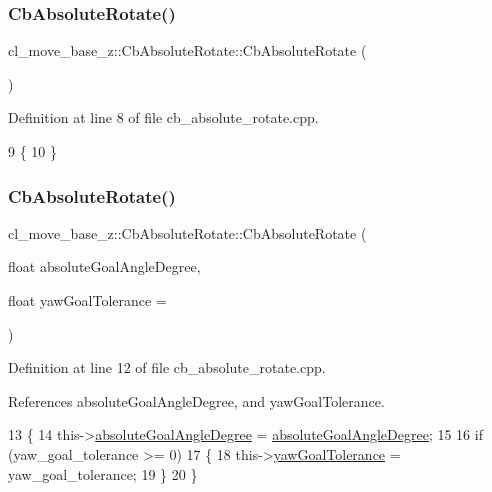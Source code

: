\subsubsection{\texorpdfstring{Cb\+Absolute\+Rotate()}{CbAbsoluteRotate()}\hspace{0.1cm}{\footnotesize\ttfamily [1/2]}}
{\footnotesize\ttfamily cl\+\_\+move\+\_\+base\+\_\+z\+::\+Cb\+Absolute\+Rotate\+::\+Cb\+Absolute\+Rotate (\begin{DoxyParamCaption}{ }\end{DoxyParamCaption})}



Definition at line 8 of file cb\+\_\+absolute\+\_\+rotate.\+cpp.


\begin{DoxyCode}
9 \{
10 \}
\end{DoxyCode}
\mbox{\label{classcl__move__base__z_1_1CbAbsoluteRotate_ac2149ffade91cd127e476b3ece3300dd}} 
\subsubsection{\texorpdfstring{Cb\+Absolute\+Rotate()}{CbAbsoluteRotate()}\hspace{0.1cm}{\footnotesize\ttfamily [2/2]}}
{\footnotesize\ttfamily cl\+\_\+move\+\_\+base\+\_\+z\+::\+Cb\+Absolute\+Rotate\+::\+Cb\+Absolute\+Rotate (\begin{DoxyParamCaption}\item[{float}]{absolute\+Goal\+Angle\+Degree,  }\item[{float}]{yaw\+Goal\+Tolerance = {} }\end{DoxyParamCaption})}



Definition at line 12 of file cb\+\_\+absolute\+\_\+rotate.\+cpp.



References absolute\+Goal\+Angle\+Degree, and yaw\+Goal\+Tolerance.


\begin{DoxyCode}
13 \{
14     this->\hyperlink{classcl__move__base__z_1_1CbAbsoluteRotate_ad5d0e21549940444e1cb525cda73329a}{absoluteGoalAngleDegree} = 
      \hyperlink{classcl__move__base__z_1_1CbAbsoluteRotate_ad5d0e21549940444e1cb525cda73329a}{absoluteGoalAngleDegree};
15 
16     \textcolor{keywordflow}{if} (yaw\_goal\_tolerance >= 0)
17     \{
18         this->\hyperlink{classcl__move__base__z_1_1CbAbsoluteRotate_a8d8b5b9c2c821efe101bb07c96c4bdd3}{yawGoalTolerance} = yaw\_goal\_tolerance;
19     \}
20 \}
\end{DoxyCode}


